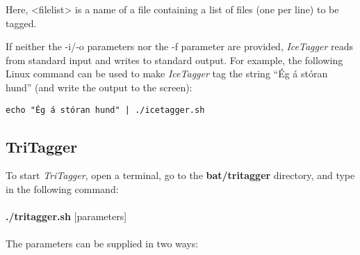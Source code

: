 \documentclass[11pt]{article}
\begin{document}
\begin{itemize}
Here, <filelist> is a name of a file containing a list of files (one per line) to be tagged.

If neither the -i/-o parameters nor the -f parameter are provided, \textit{IceTagger} reads from standard input and writes to standard output. For example, the following Linux command can be used to make \textit{IceTagger} tag the string ``Ég á stóran hund'' (and write the output to the screen): 
\begin{verbatim}
echo "Ég á stóran hund" | ./icetagger.sh 
\end{verbatim}

\end{itemize}

\subsection{TriTagger}
\label{sec:tritagger_usage}
To start \emph{TriTagger}, open a terminal, go to the \textbf{bat/tritagger} directory, and type in the following command:\\ \\
{\bf ./tritagger.sh} [parameters] \\ \\
The parameters can be supplied in two ways:
\end{document}
